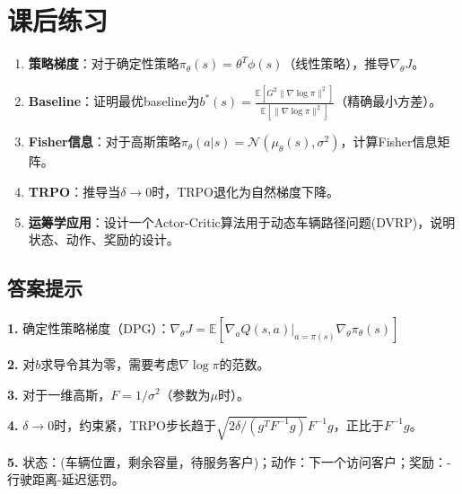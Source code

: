 \documentclass[11pt,a4paper]{article}
\theoremstyle{definition}
\begin{document}
\section*{课后练习}

\begin{enumerate}
    \item \textbf{策略梯度}：对于确定性策略$\pi_\theta(s) = \theta^T \phi(s)$（线性策略），推导$\nabla_\theta J$。
    
    \item \textbf{Baseline}：证明最优baseline为$b^*(s) = \frac{\mathbb{E}[G^2 \|\nabla \log \pi\|^2]}{\mathbb{E}[\|\nabla \log \pi\|^2]}$（精确最小方差）。
    
    \item \textbf{Fisher信息}：对于高斯策略$\pi_\theta(a|s) = \mathcal{N}(\mu_\theta(s), \sigma^2)$，计算Fisher信息矩阵。
    
    \item \textbf{TRPO}：推导当$\delta \to 0$时，TRPO退化为自然梯度下降。
    
    \item \textbf{运筹学应用}：设计一个Actor-Critic算法用于动态车辆路径问题(DVRP)，说明状态、动作、奖励的设计。
\end{enumerate}

\subsection*{答案提示}

\textbf{1.} 确定性策略梯度（DPG）：$\nabla_\theta J = \mathbb{E}[\nabla_a Q(s,a)|_{a=\pi(s)} \nabla_\theta \pi_\theta(s)]$

\textbf{2.} 对$b$求导令其为零，需要考虑$\nabla \log \pi$的范数。

\textbf{3.} 对于一维高斯，$F = 1/\sigma^2$（参数为$\mu$时）。

\textbf{4.} $\delta \to 0$时，约束紧，TRPO步长趋于$\sqrt{2\delta/(g^T F^{-1} g)} F^{-1} g$，正比于$F^{-1} g$。

\textbf{5.} 状态：(车辆位置，剩余容量，待服务客户)；动作：下一个访问客户；奖励：-行驶距离-延迟惩罚。
\end{document}
